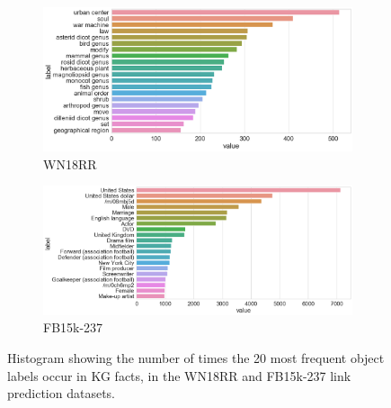 \begin{figure}
	\begin{subfigure}[b]{.5\linewidth}
   		\centering
    		\includegraphics[width=1.0\linewidth, height=0.7\linewidth]{WN18RR_Object_Counts}
		\captionsetup{justification=centering}
		\caption{WN18RR}
	\end{subfigure}
	\begin{subfigure}[b]{.5\linewidth}
   		\centering
		\includegraphics[width=1.0\linewidth, height=0.7\linewidth]{FB15k-237_Object_Counts}
		\captionsetup{justification=centering}
		\caption{FB15k-237}
	\end{subfigure}
	\captionsetup{justification=centering}
	\caption{Histogram showing the number of times the 20 most frequent object labels occur in KG facts, in the WN18RR and FB15k-237 link prediction datasets.}
\end{figure}

